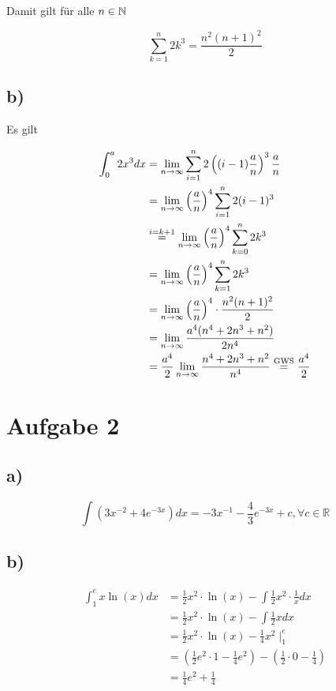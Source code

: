 \documentclass[a4paper, 11pt]{article}
\begin{document}
Damit gilt für alle \(n \in \mathbb{N}\)

\begin{equation*}
    \sum_{k = 1}^{n} 2 k^3 = \frac{n^2(n+1)^2}{2}
\end{equation*}

\subsection{b)}
\label{sec:org66c7fa5}
Es gilt

\begin{align*}
    \int_{0}^{a} 2 x^3 dx &=
        \lim_{n \rightarrow \infty}
            \sum_{i=1}^{n} 2\left((i-1)\frac{a}{n}\right)^3 \frac{a}{n} \\
    &= \lim_{n \rightarrow \infty}
            \left(\frac{a}{n}\right)^4 \sum_{i=1}^{n} 2(i-1)^3 \\
    &\overset{i=k+1}{=} \lim_{n \rightarrow \infty}
            \left(\frac{a}{n}\right)^4 \sum_{k=0}^{n} 2k^3 \\
    &= \lim_{n \rightarrow \infty}
            \left(\frac{a}{n}\right)^4 \sum_{k=1}^{n} 2k^3 \\
    &= \lim_{n \rightarrow \infty}
            \left(\frac{a}{n}\right)^4 \cdot \frac{n^2(n+1)^2}{2} \\
    &= \lim_{n \rightarrow \infty}
            \frac{a^4 (n^4 + 2n^3 + n^2)}{2 n^4} \\
    &= \frac{a^4}{2} \lim_{n \rightarrow \infty}
            \frac{n^4 + 2n^3 + n^2}{n^4}
        \overset{\text{GWS}}{=} \frac{a^4}{2}
\end{align*}

\section{Aufgabe 2}
\label{sec:orge538fc3}
\subsection{a)}
\label{sec:orgb8e479e}
\begin{equation*}
	\int (3x^{-2} + 4e^{-3x}) dx = -3x^{-1} - \frac{4}{3}e^{-3x} + c, \forall c \in \mathbb{R}
\end{equation*}

\subsection{b)}
\label{sec:org97e29c4}
\begin{align*}
	\int_1^e x\ln(x) dx &= \frac{1}{2}x^2 \cdot \ln(x) - \int \frac{1}{2}x^2 \cdot \frac{1}{x} dx \\
				    &= \frac{1}{2}x^2 \cdot \ln(x) - \int \frac{1}{2}x dx \\
				    &= \frac{1}{2}x^2 \cdot \ln(x) - \frac{1}{4}x^2 \; \bigg|_{1}^{e} \\
				    &= \left(\frac{1}{2}e^2 \cdot 1 - \frac{1}{4}e^2\right) - \left(\frac{1}{2} \cdot 0 - \frac{1}{4}\right) \\
				    &= \frac{1}{4}e^2 + \frac{1}{4}
\end{align*}
\end{document}
